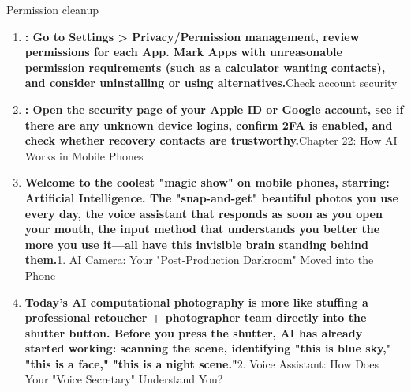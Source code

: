 \begin{tcbpractice}{Permission cleanup}
\begin{enumerate}
  \item \textbf{: Go to Settings > Privacy/Permission management, review permissions for each App. Mark Apps with unreasonable permission requirements (such as a calculator wanting contacts), and consider uninstalling or using alternatives.}Check account security
  \item \textbf{: Open the security page of your Apple ID or Google account, see if there are any unknown device logins, confirm 2FA is enabled, and check whether recovery contacts are trustworthy.}Chapter 22: How AI Works in Mobile Phones
  \item \textbf{Welcome to the coolest "magic show" on mobile phones, starring: Artificial Intelligence. The "snap-and-get" beautiful photos you use every day, the voice assistant that responds as soon as you open your mouth, the input method that understands you better the more you use it—all have this invisible brain standing behind them.}1. AI Camera: Your "Post-Production Darkroom" Moved into the Phone
  \item \textbf{Today's AI computational photography is more like stuffing a professional retoucher + photographer team directly into the shutter button. Before you press the shutter, AI has already started working: scanning the scene, identifying "this is blue sky," "this is a face," "this is a night scene."}2. Voice Assistant: How Does Your "Voice Secretary" Understand You?
\end{enumerate}

\end{tcbpractice}
